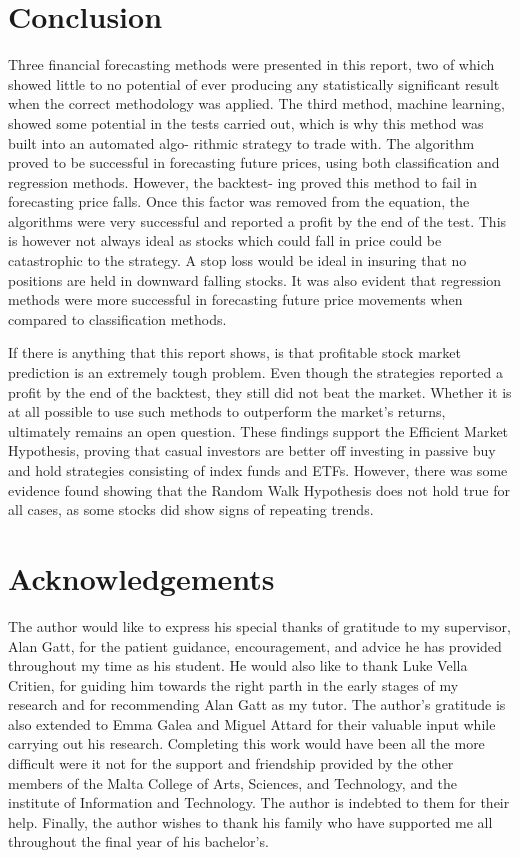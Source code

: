 \documentclass[times]{jtitauth}
\begin{document}
\section{Conclusion}
Three financial forecasting methods were presented in this report, two of which showed little to no potential of ever producing any statistically significant result when the correct methodology was applied. The third method, machine learning, showed some potential in the tests carried out, which is why this method was built into an automated algo- rithmic strategy to trade with. The algorithm proved to be successful in forecasting future prices, using both classification and regression methods. However, the backtest- ing proved this method to fail in forecasting price falls. Once this factor was removed from the equation, the algorithms were very successful and reported a profit by the end of the test. This is however not always ideal as stocks which could fall in price could be catastrophic to the strategy. A stop loss would be ideal in insuring that no positions are held in downward falling stocks. It was also evident that regression methods were more successful in forecasting future price movements when compared to classification methods.

If there is anything that this report shows, is that profitable stock market prediction is an extremely tough problem. Even though the strategies reported a profit by the end of the backtest, they still did not beat the market. Whether it is at all possible to use such methods to outperform the market’s returns, ultimately remains an open question. These findings support the Efficient Market Hypothesis, proving that casual investors are better off investing in passive buy and hold strategies consisting of index funds and ETFs. However, there was some evidence found showing that the Random Walk Hypothesis does not hold true for all cases, as some stocks did show signs of repeating trends.

\section*{Acknowledgements}

The author would like to express his special thanks of gratitude to my supervisor, Alan Gatt, for the patient guidance, encouragement, and advice he has provided throughout my time as his student. He would also like to thank Luke Vella Critien, for guiding him towards the right parth in the early stages of my research and for recommending Alan Gatt as my tutor. The author's gratitude is also extended to Emma Galea and Miguel Attard for their valuable input while carrying out his research. Completing this work would have been all the more difficult were it not for the support and friendship provided by the other members of the Malta College of Arts, Sciences, and Technology, and the institute of Information and Technology. The author is indebted to them for their help. Finally, the author wishes to thank his family who have supported me all throughout the final year of his bachelor’s.
\end{document}
